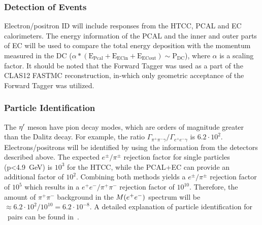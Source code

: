 \subsubsection{Detection of \epemT Events} 
Electron/positron ID will include responses from the HTCC, PCAL and EC calorimeters. The energy information of the PCAL and the inner and outer parts of EC will be used to compare the total energy deposition with the momentum measured in the DC ($\alpha*(\mathrm{E_{Pcal}} + \mathrm{E_{ECin}}+ \mathrm{E_{ECout}}) \sim \mathrm{P_{DC}}$), where $\alpha$ is a scaling factor.  It should be noted that the Forward Tagger was used as a part of the CLAS12 FASTMC reconstruction, in-which only geometric acceptance of the Forward Tagger was utilized.
\subsubsection{Particle Identification}
The $\eta^{\prime}$ meson have pion decay modes, which are orders of magnitude greater than the Dalitz decay. For example, the ratio $\Gamma_{\pi^+\pi^-\gamma} / \Gamma_{e^+e^- \gamma} $ is $ 6.2\cdot 10^2$. 
Electrons/positrons will be identified by using the information from the detectors described above. The expected $e^\pm/\pi^\pm$ rejection factor for single particles (p<4.9~GeV) is $10^3$ for the HTCC, while the PCAL+EC can provide an additional factor of $10^2$. Combining both methods yields a $e^\pm/\pi^\pm$ rejection factor of $10^5$ which results in a $e^+e^-/\pi^+\pi^-$ rejection factor of $10^{10}$. Therefore, the amount of $\pi^+\pi^-$ background in the $M(e^+e^-)$ spectrum will be $\approx 6.2\cdot 10^2/10^{10} = 6.2\cdot10^{-8}$. A detailed explanation of particle identification for \epemT \ pairs can be found in~\cite{clas.proposal.jpsi}.
